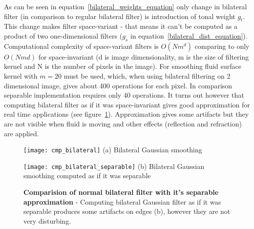 As can be seen in equation~\ref{bilateral_weights_equation} only change in bilateral filter (in comparison to regular bilateral filter) is introduction of tonal weight $g_t$. This change makes filter space-variant - that means it can't be computed as a product of two one-dimensional filters ($g_s$ in equation~\ref{bilateral_dist_equation}). 
Computational complexity of space-variant filters is $O(Nm^d)$ comparing to only $O(Nmd)$ for space-invariant (d is image dimensionality, m is the size of filtering kernel and N is the number of pixels in the image). For smoothing fluid surface kernel with $m = 20$ must be used, which, when using bilateral filtering on 2 dimensional image, gives about 400 operations for each pixel. In comparison separable implementation requires only 40 operations. It turns out however that computing bilateral filter as if it was space-invariant gives good approximation for real time applications (see figure~\ref{bilateral_comp}). Approximation gives some artifacts but they are not visible when fluid is moving and other effects (reflection and refraction) are applied.

\begin{figure}[ht]
\begin{minipage}[t]{0.5\linewidth}
\centering
\texttt{[image: cmp\_bilateral]}
(a) Bilateral Gaussian smoothing
\end{minipage}
\hspace{0.2cm}
\begin{minipage}[t]{0.5\linewidth}
\centering
\texttt{[image: cmp\_bilateral\_separable]}
(b) Bilateral Gaussian smoothing computed as if it was separable
\end{minipage}
\caption{\textbf{Comparision of normal bilateral filter with it's separable approximation} -  Computing bilateral Gaussian filter as if it was separable produces some artifacts on edges (b), however they are not very disturbing.}
\label{bilateral_comp}
\end{figure}

